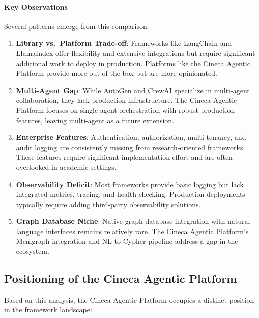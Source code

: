 \paragraph{Key Observations}

Several patterns emerge from this comparison:

\begin{enumerate}
    \item \textbf{Library vs.\ Platform Trade-off}: Frameworks like LangChain and LlamaIndex offer flexibility and extensive integrations but require significant additional work to deploy in production. Platforms like the Cineca Agentic Platform provide more out-of-the-box but are more opinionated.
    
    \item \textbf{Multi-Agent Gap}: While AutoGen and CrewAI specialize in multi-agent collaboration, they lack production infrastructure. The Cineca Agentic Platform focuses on single-agent orchestration with robust production features, leaving multi-agent as a future extension.
    
    \item \textbf{Enterprise Features}: Authentication, authorization, multi-tenancy, and audit logging are consistently missing from research-oriented frameworks. These features require significant implementation effort and are often overlooked in academic settings.
    
    \item \textbf{Observability Deficit}: Most frameworks provide basic logging but lack integrated metrics, tracing, and health checking. Production deployments typically require adding third-party observability solutions.
    
    \item \textbf{Graph Database Niche}: Native graph database integration with natural language interfaces remains relatively rare. The Cineca Agentic Platform's Memgraph integration and NL-to-Cypher pipeline address a gap in the ecosystem.
\end{enumerate}

\subsection{Positioning of the Cineca Agentic Platform}

Based on this analysis, the Cineca Agentic Platform occupies a distinct position in the framework landscape:

